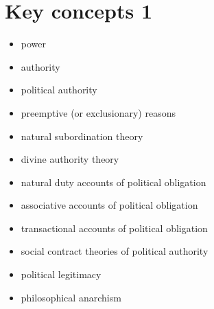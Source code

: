 \section{Key concepts 1}

\begin{itemize}
	\item power
	\item authority
	\item political authority
	\item preemptive (or exclusionary) reasons
	\item natural subordination theory
	\item divine authority theory
	\item natural duty accounts of political obligation
	\item associative accounts of political obligation
	\item transactional accounts of political obligation
	\item social contract theories of political authority
	\item political legitimacy
	\item philosophical anarchism
\end{itemize}
